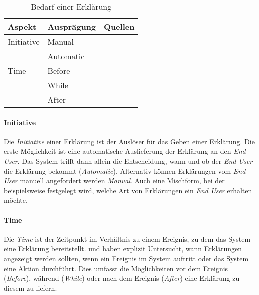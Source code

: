 \begin{table}[hbt!]
    \begin{center}
        \begin{tabular}{|p{}|p{}|p{}|}
            \hline
            \textbf{Aspekt}    & \textbf{Ausprägung}   & \textbf{Quellen} \\ \hline
            Initiative              &  Manual        & \cite{chazette_end-users_nodate} \cite{tintarev_designing_nodate} \cite{wiegand_id_2020} \\
                                    &  Automatic   & \cite{chazette_end-users_nodate} \cite{eiband_impact_2019} \cite{wiegand_id_2020} \cite{schaffer_i_2019} \cite{yamada_evaluating_2016} \\
            \hline
            Time                &  Before               & \cite{rosenfeld_explainability_2019} \cite{wiegand_id_2020} \cite{kunkel_let_2019} \cite{koo_why_2015} \cite{haspiel_explanations_2018} \\
                                    &  While                & \cite{rosenfeld_explainability_2019} \cite{wiegand_id_2020} \cite{kunkel_let_2019} \\
                                    &  After                & \cite{rosenfeld_explainability_2019} \cite{wiegand_id_2020} \cite{kunkel_let_2019} \cite{koo_why_2015} \cite{haspiel_explanations_2018} \cite{wiegand2019drive} \\
            \hline
        \end{tabular}
    \end{center}
    \caption{Bedarf einer Erklärung}
    \label{tab:explanation_demands}
\end{table}

\paragraph{Initiative} Die \textit{Initiative} einer Erklärung ist der Auslöser für das Geben einer Erklärung. Die erste Möglichkeit ist eine automatische Auslieferung der Erklärung an den \textit{End User}. Das System trifft dann allein die Entscheidung, wann und ob der \textit{End User} die Erklärung bekommt (\textit{Automatic}). Alternativ können Erklärungen vom \textit{End User} manuell angefordert werden \textit{Manual}. Auch eine Mischform, bei der beispielsweise festgelegt wird, welche Art von Erklärungen ein \textit{End User} erhalten möchte.

\paragraph{Time} Die \textit{Time} ist der Zeitpunkt im Verhältnis zu einem Ereignis, zu dem das System eine Erklärung bereitstellt. \citeauthor{rosenfeld_explainability_2019} und \citeauthor{wiegand_id_2020} haben explizit Untersucht, wann Erklärungen angezeigt werden sollten, wenn ein Ereignis im System auftritt oder das System eine Aktion durchführt. Dies umfasst die Möglichkeiten vor dem Ereignis (\textit{Before}), während (\textit{While}) oder nach dem Ereignis (\textit{After}) eine Erklärung zu diesem zu liefern.

